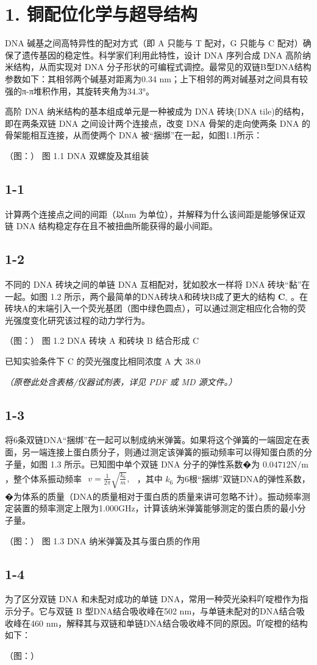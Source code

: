 \section*{1. 铜配位化学与超导结构}
DNA 碱基之间⾼特异性的配对⽅式（即 A 只能与 T 配对，G 只能与 C 配对）确保了遗传基因的稳定性。科学家们利⽤此特性，设计 DNA 序列合成 DNA ⾼阶纳⽶结构，从⽽实现对 DNA 分⼦形状的可编程式调控。最常⻅的双链B型DNA结构参数如下：其相邻两个碱基对距离为0.34 nm；上下相邻的两对碱基对之间具有较强的π-π堆积作⽤，其旋转夹⻆为34.3°。

⾼阶 DNA 纳⽶结构的基本组成单元是⼀种被成为 DNA 砖块(DNA tile)的结构，即在两条双链 DNA 之间设计两个连接点，改变 DNA ⻣架的⾛向使两条 DNA 的⻣架能相互连接，从⽽使两个 DNA 被“捆绑”在⼀起，如图1.1所⽰：

（图：）
图 1.1 DNA 双螺旋及其组装

\subsection*{1-1}
计算两个连接点之间的间距（以nm 为单位），并解释为什么该间距是能够保证双链 DNA 结构稳定存在且不被扭曲所能获得的最⼩间距。

\subsection*{1-2}
不同的 DNA 砖块之间的单链 DNA 互相配对，犹如胶⽔⼀样将 DNA 砖块“黏”在⼀起。如图 1.2 所⽰，两个最简单的DNA砖块A和砖块B成了更⼤的结构 $\mathbf { C } _ { \circ }$ 。在砖块A的末端引⼊⼀个荧光基团（图中绿⾊圆点），可以通过测定相应化合物的荧光强度变化研究该过程的动⼒学⾏为。

（图：）
图 1.2 DNA 砖块 A 和砖块 B 结合形成 C

已知实验条件下 C 的荧光强度⽐相同浓度 A ⼤ 38.0%

\textit{（原卷此处含表格/仪器试剂表，详见 PDF 或 MD 源文件。）}

\subsection*{1-3}
将6条双链DNA“捆绑”在⼀起可以制成纳⽶弹簧。如果将这个弹簧的⼀端固定在表⾯，另⼀端连接上蛋⽩质分⼦，则通过测定该弹簧的振动频率可以得知蛋⽩质的分⼦量，如图 1.3 所⽰。已知图中单个双链 DNA 分⼦的弹性系数�为 $0 . 0 4 7 1 2 \mathrm { N } / \mathrm { m }$ ，整个体系振动频率 $\begin{array} { r } { v = \frac { 1 } { 2 \pi } \sqrt { \frac { k _ { 6 } } { m } } , } \end{array}$ ，其中 $k _ { 6 }$ 为6根“捆绑”双链DNA的弹性系数，�为体系的质量（DNA的质量相对于蛋⽩质的质量来讲可忽略不计）。振动频率测定装置的频率测定上限为1.000GHz，计算该纳⽶弹簧能够测定的蛋⽩质的最⼩分⼦量。

（图：）
图 1.3 DNA 纳⽶弹簧及其与蛋⽩质的作⽤

\subsection*{1-4}
为了区分双链 DNA 和未配对成功的单链 DNA，常⽤⼀种荧光染料吖啶橙作为指⽰分⼦。它与双链 B 型DNA结合吸收峰在502 nm，与单链未配对的DNA结合吸收峰在460 nm，解释其与双链和单链DNA结合吸收峰不同的原因。吖啶橙的结构如下：

（图：）
